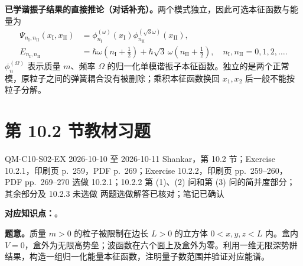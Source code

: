 \begin{checkedsolution}
\textbf{已学谐振子结果的直接推论（对话补充）。}两个模式独立，因此可选本征函数与能量为
\begin{align}
  \Psi_{n_{\mathrm I},n_{\mathrm{II}}}(x_{\mathrm I},x_{\mathrm{II}})
    &=\phi_{n_{\mathrm I}}^{(\omega)}(x_{\mathrm I})
      \phi_{n_{\mathrm{II}}}^{(\sqrt3\omega)}(x_{\mathrm{II}}),\\
  E_{n_{\mathrm I},n_{\mathrm{II}}}
    &=\hbar\omega\left(n_{\mathrm I}+\tfrac12\right)
      +\hbar\sqrt3\,\omega\left(n_{\mathrm{II}}+\tfrac12\right),
      \quad n_{\mathrm I},n_{\mathrm{II}}=0,1,2,\ldots.
\end{align}
$\phi_n^{(\Omega)}$ 表示质量 $m$、频率 $\Omega$ 的归一化单模谐振子本征函数。独立的是两个正常模，原粒子之间的弹簧耦合没有被删除；乘积本征函数换回 $x_1,x_2$ 后一般不能按粒子分解。
\end{checkedsolution}

\section{第 10.2 节教材习题}
\label{exercise-set:QM-C10-S02}
\exercisemeta
  {QM-C10-S02-EX}
  {2026-10-10 至 2026-10-11}
  {Shankar，第 10.2 节；Exercise 10.2.1，印刷页 p.~259，PDF p.~269；Exercise 10.2.2，印刷页 pp.~259--260，PDF pp.~269--270}
  {选做 10.2.1；10.2.2 第 (1)、(2) 问和第 (3) 问的简并度部分；其余部分及 10.2.3 未选做}
  {两题选做解答已核对；笔记已确认}

\textbf{对应知识点：}。

\textbf{题意。}质量 $m>0$ 的粒子被限制在边长 $L>0$ 的立方体 $0<x,y,z<L$ 内。盒内 $V=0$，盒外为无限高势垒；波函数在六个面上及盒外为零。利用一维无限深势阱结果，构造一组归一化能量本征函数，注明量子数范围并验证对应能谱。

